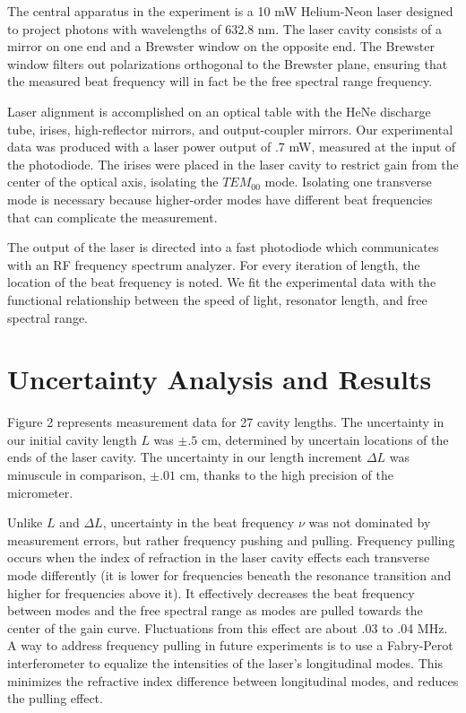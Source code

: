 \documentclass[journal, a4paper]{IEEEtran}
\begin{document}
The central apparatus in the experiment is a 10 mW Helium-Neon laser designed to project photons with wavelengths of 632.8 nm. The laser cavity consists of a mirror on one end and a Brewster window on the opposite end. The Brewster window filters out polarizations orthogonal to the Brewster plane, ensuring that the measured beat frequency will in fact be the free spectral range frequency.

Laser alignment is accomplished on an optical table with the HeNe discharge tube, irises, high-reflector mirrors, and output-coupler mirrors. Our experimental data was produced with a laser power output of .7 mW, measured at the input of the photodiode. The irises were placed in the laser cavity to restrict gain from the center of the optical axis, isolating the $TEM_{00}$ mode. Isolating one transverse mode is necessary because higher-order modes have different beat frequencies that can complicate the measurement.\cite{beat}

The output of the laser is directed into a fast photodiode which communicates with an RF frequency spectrum analyzer.  For every iteration of length, the location of the beat frequency is noted. We fit the experimental data with the functional relationship between the speed of light, resonator length, and free spectral range.

\section{Uncertainty Analysis and Results}

Figure 2 represents measurement data for 27 cavity lengths.  The uncertainty in our initial cavity length $ L $  was $\pm .5$ cm, determined by uncertain locations of the ends of the laser cavity. The uncertainty in our length increment $\Delta L$ was minuscule in comparison, $\pm .01 $ cm, thanks to the high precision of the micrometer.

Unlike $L$ and $\Delta L$, uncertainty in the beat frequency $\nu$ was not dominated by measurement errors, but rather frequency pushing and pulling. Frequency pulling occurs when the index of refraction in the laser cavity effects each transverse mode differently (it is lower for frequencies beneath the resonance transition and higher for frequencies above it)\cite{beat}. It effectively decreases the beat frequency between modes and the free spectral range as modes are pulled towards the center of the gain curve. Fluctuations from this effect are about .03 to .04 MHz\cite{pulling}. A way to address frequency pulling in future experiments is to use a Fabry-Perot interferometer to equalize the intensities of the laser's longitudinal modes. This minimizes the refractive index difference between longitudinal modes, and reduces the pulling effect.
\end{document}
